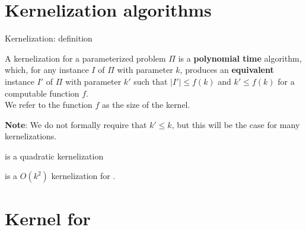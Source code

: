 \section{Kernelization algorithms}

\begin{frame}{Kernelization: definition}

	\begin{definition}
		A \alert{kernelization} for a parameterized problem $\Pi$ is a
		\textbf{polynomial time} algorithm, which, for any instance $I$ of $\Pi$ with parameter $k$,
		produces an \textbf{equivalent} instance $I'$ of $\Pi$ with parameter $k'$ such that
		$|I'| \le f(k)$ and $k'\le f(k)$ for a computable function $f$.\\
		We refer to the function $f$ as the \alert{size} of the kernel.
	\end{definition}

	\noindent
	\textbf{Note}: We do not formally require that $k'\le k$, but this will be the case for many kernelizations.

\end{frame}


\begin{frame}{\vcpre is a quadratic kernelization}
	\begin{theorem}
		\vcpre is a $O(k^2)$ kernelization for \VC.
	\end{theorem}

\end{frame}

\section{Kernel for \HC}

